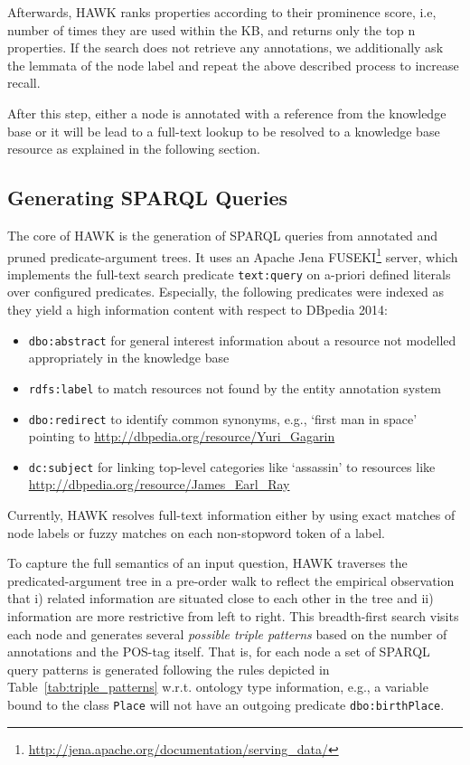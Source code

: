 Afterwards, HAWK ranks properties according to their prominence score, i.e, number of times they are used within the \ac{KB}, and returns only the top n properties.
If the search does not retrieve any annotations, we additionally ask the lemmata of the node label and repeat the above described process to increase recall.

After this step, either a node is annotated with a reference from the knowledge base %
or it will be lead to a full-text lookup to be resolved to a knowledge base resource as explained in the following section.


\subsection{Generating SPARQL Queries}
\label{chahawk:sec:full-text}

The core of HAWK is the generation of SPARQL queries from annotated and pruned predicate-argument trees.
It uses an Apache Jena FUSEKI\footnote{\url{http://jena.apache.org/documentation/serving_data/}} server, which implements the full-text search predicate \texttt{text:query} on a-priori defined literals over configured predicates. %
Especially, the following predicates were indexed as they yield a high information content with respect to DBpedia 2014:
\begin{itemize}
 \item \texttt{dbo:abstract} for general interest information about a resource not modelled appropriately in the knowledge base
 \item \texttt{rdfs:label} to match resources not found by the entity annotation system%
 \item \texttt{dbo:redirect} to identify common synonyms, e.g., `first man in space' pointing to \url{http://dbpedia.org/resource/Yuri_Gagarin}
 \item \texttt{dc:subject} for linking top-level categories like `assassin' to resources like \url{http://dbpedia.org/resource/James_Earl_Ray}
\end{itemize}
Currently, HAWK resolves full-text information either by using exact matches of node labels or fuzzy matches on each non-stopword token of a label.

To capture the full semantics of an input question, HAWK traverses the predicated-argument tree in a pre-order walk to reflect the empirical observation that i) related information are situated close to each other in the tree and ii) information are more restrictive from left to right.
This breadth-first search visits each node and generates several \emph{possible triple patterns} based on the number of annotations and the POS-tag itself. 
That is, for each node a set of SPARQL query patterns is generated following the rules depicted in Table~\ref{tab:triple_patterns} w.r.t. ontology type information, e.g., a variable bound to the class \texttt{Place} will not have an outgoing predicate \texttt{dbo:birthPlace}.

